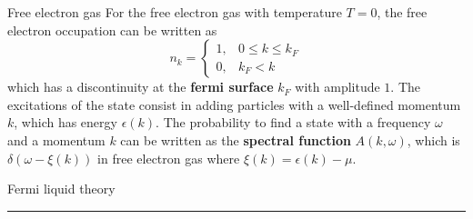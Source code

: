 \begin{statement}{Free electron gas} For the free electron gas with temperature $T=0$, the free electron occupation can be written as
\begin{equation}
n_k=\begin{cases}
1,&0\leq k\leq k_F\\
0,&k_F<k
\end{cases}
\end{equation}
which has a discontinuity at the \textbf{fermi surface} $k_F$ with amplitude $1$. The excitations of the state consist in adding particles with a well-defined momentum $k$, which has energy $\epsilon(k)$. The probability to find a state with a frequency $\omega$ and a momentum $k$ can be written as the \textbf{spectral function} $A(k,\omega)$, which is $\delta(\omega-\xi(k))$ in free electron gas where $\xi(k)=\epsilon(k)-\mu$.
\end{statement}

\begin{statement}{Fermi liquid theory}
\end{statement}
\noindent\rule{\textwidth}{1pt}
\newline